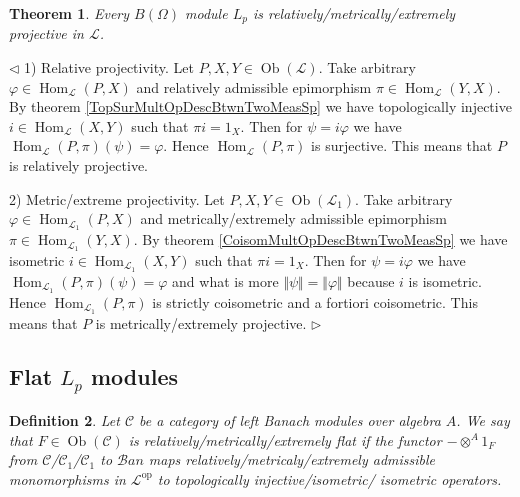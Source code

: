 \documentclass[12pt]{article}
\newtheorem{theorem}{Theorem}[subsection]
\newtheorem{definition}[theorem]{Definition}
\newenvironment{proof}{\par $\triangleleft$}{$\triangleright$}
\begin{document}
\begin{theorem} Every $B(\Omega)$ module $L_p$ is relatively/metrically/extremely projective in $\mathscr{L}$.
\end{theorem}
\begin{proof}
1) Relative projectivity. Let $P,X,Y\in\operatorname{Ob}(\mathscr{L})$. Take arbitrary $\varphi\in\operatorname{Hom}_{\mathscr{L}}(P, X)$ and relatively admissible  epimorphism $\pi\in\operatorname{Hom}_{\mathscr{L}}(Y, X)$. By theorem \ref{TopSurMultOpDescBtwnTwoMeasSp} we have topologically injective $i\in\operatorname{Hom}_{\mathscr{L}}(X, Y)$ such that $\pi i=1_{X}$. Then for $\psi=i\varphi$ we have $\operatorname{Hom}_{\mathscr{L}}(P,\pi)(\psi)=\varphi$. Hence $\operatorname{Hom}_{\mathscr{L}}(P,\pi)$ is surjective. This means that $P$ is relatively projective.

2) Metric/extreme projectivity. Let $P,X,Y\in\operatorname{Ob}(\mathscr{L}_1)$. Take arbitrary $\varphi\in\operatorname{Hom}_{\mathscr{L}_1}(P, X)$ and metrically/extremely admissible epimorphism $\pi\in\operatorname{Hom}_{\mathscr{L}_1}(Y, X)$. By theorem \ref{CoisomMultOpDescBtwnTwoMeasSp} we have isometric $i\in\operatorname{Hom}_{\mathscr{L}_1}(X, Y)$ such that $\pi i=1_{X}$. Then for $\psi=i\varphi$ we have $\operatorname{Hom}_{\mathscr{L}_1}(P,\pi)(\psi)=\varphi$ and what is more $\Vert\psi\Vert=\Vert\varphi\Vert$ because $i$ is isometric. Hence $\operatorname{Hom}_{\mathscr{L}_1}(P,\pi)$ is strictly coisometric and a fortiori coisometric. This means that $P$ is metrically/extremely projective.
\end{proof}



















\subsection{Flat \texorpdfstring{$L_p$}{Lp} modules}

\begin{definition} Let $\mathscr{C}$ be a category of left Banach modules over algebra $A$. We say that $F\in\operatorname{Ob}(\mathscr{C})$ is relatively/metrically/extremely flat if the functor $-\mathop{\operatorname{\otimes}}^A 1_F$ from $\mathscr{C}$/$\mathscr{C}_1$/$\mathscr{C}_1$ to $\mathscr{B}an$ maps relatively/metricaly/extremely admissible monomorphisms in $\mathscr{L}^{\operatorname{op}}$ to topologically injective/isometric/
isometric operators.
\end{definition}
\end{document}
